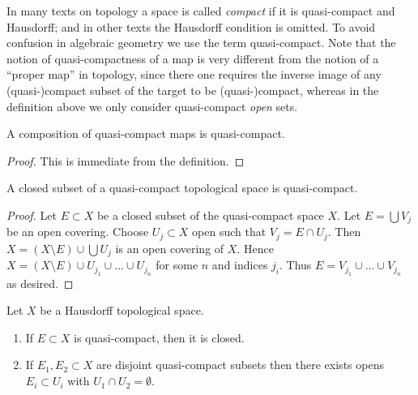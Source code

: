 \noindent
In many texts on topology a space is called {\it compact} if it
is quasi-compact and Hausdorff; and in other texts the Hausdorff
condition is omitted. To avoid confusion in algebraic geometry
we use the term quasi-compact. Note that the notion of quasi-compactness
of a map is very different from the notion of a ``proper map''
in topology, since there one requires the inverse image of any
(quasi-)compact subset of the target to be (quasi-)compact,
whereas in the definition above we only consider quasi-compact
{\it open} sets.

\begin{lemma}
\label{lemma-composition-quasi-compact}
A composition of quasi-compact maps is quasi-compact.
\end{lemma}

\begin{proof}
This is immediate from the definition.
\end{proof}

\begin{lemma}
\label{lemma-closed-in-quasi-compact}
A closed subset of a quasi-compact topological space is quasi-compact.
\end{lemma}

\begin{proof}
Let $E \subset X$ be a closed subset of the quasi-compact space $X$.
Let $E = \bigcup V_j$ be an open covering. Choose $U_j \subset X$
open such that $V_j = E \cap U_j$. Then $X = (X \setminus E) \cup \bigcup U_j$
is an open covering of $X$. Hence
$X = (X \setminus E) \cup U_{j_1} \cup \ldots \cup U_{j_n}$ for some
$n$ and indices $j_i$. Thus $E = V_{j_1} \cup \ldots \cup V_{j_n}$
as desired.
\end{proof}

\begin{lemma}
\label{lemma-quasi-compact-in-Hausdorff}
Let $X$ be a Hausdorff topological space.
\begin{enumerate}
\item If $E \subset X$ is quasi-compact, then it is closed.
\item If $E_1, E_2 \subset X$ are disjoint quasi-compact subsets
then there exists opens $E_i \subset U_i$ with $U_1 \cap U_2 = \emptyset$.
\end{enumerate}
\end{lemma}


